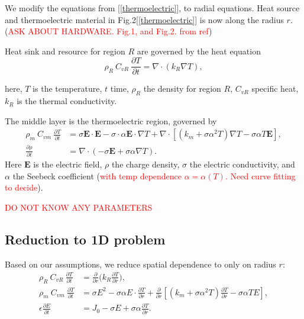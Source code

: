\documentclass[12pt]{article}
\newcommand\bE{{\mathbf E}}
\begin{document}

We modify the equations from [\ref{thermoelectric}], to radial equations.
Heat source and thermoelectric material in Fig.2[\ref{thermoelectric}] is now along the radius $r$. (\textcolor{red}{ASK ABOUT HARDWARE. Fig.1, and Fig.2. from ref})

Heat sink and resource for region $R$ are governed by the heat equation
\begin{equation}
\rho_R\ C_{vR}\ \frac{\partial T}{\partial t}=\nabla\cdot (k_R\nabla T),\label{heat}
\end{equation}

here, $T$ is the temperature, $t$ time, $\rho_R$ the density for region $R$, $C_{vR}$ specific heat, $k_R$ is the thermal conductivity. 

The middle layer is the thermoelectric region, governed by 
\begin{align}
\rho_{m}\ C_{vm}\ \frac{\partial T}{\partial t}&=\sigma\bE\cdot\bE-\sigma\cdot \alpha\bE\cdot \nabla T+\nabla\cdot[(k_m+\sigma\alpha^2T)\nabla T-\sigma\alpha T\bE],\label{elec}\\
\frac{\partial \rho}{\partial t}&=\nabla\cdot (-\sigma\bE+\sigma\alpha\nabla T).\label{chargedensity}
\end{align}
Here $\bE$ is the electric field, $\rho$ the charge density, $\sigma$ the electric conductivity, and $\alpha$ the Seebeck coefficient (\textcolor{red}{with temp dependence $\alpha=\alpha(T)$. Need curve fitting to decide}). 

\textcolor{red}{DO NOT KNOW ANY PARAMETERS}

\subsection{Reduction to 1D problem}
Based on our assumptions, we reduce spatial dependence to only on radius $r$: 
\begin{align}
\rho_R\ C_{vR}\ \frac{\partial T}{\partial t}&=\frac{\partial }{\partial r}\big(k_R\frac{\partial T}{\partial r}\big),\label{heat1d}\\
\rho_{m}\ C_{vm}\ \frac{\partial T}{\partial t}&=\sigma E^2-\sigma \alpha E\cdot \frac{\partial T}{\partial r}+\frac{\partial }{\partial r}[(k_m+\sigma\alpha^2T)\frac{\partial T}{\partial r}-\sigma\alpha T E],\label{elec1d}\\
\epsilon\frac{\partial E}{\partial t}&=J_0-\sigma E+\sigma\alpha\frac{\partial T}{\partial r}.\label{chargedensity1d}
\end{align}
\end{document}
